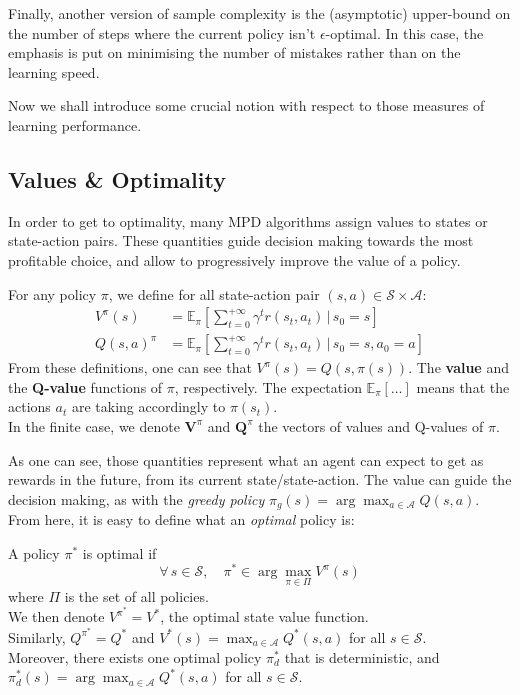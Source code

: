 Finally, another version of sample complexity is the (asymptotic) upper-bound on the number of steps where the current policy isn't $\epsilon$-optimal. In this case, the emphasis is put on minimising the number of mistakes rather than on the learning speed.

Now we shall introduce some crucial notion with respect to those measures of learning performance.

\subsection{Values \& Optimality}
\label{subsec:MDP-values}

In order to get to optimality, many MPD algorithms assign values to states or state-action pairs. These quantities guide decision making towards the most profitable choice, and allow to progressively improve the value of a policy.

\begin{defi}
  For any policy $\pi$, we define for all state-action pair $(s, a) \in \mathcal{S}\times \mathcal{A}$:
  \begin{align*}
  V^\pi(s) &= \mathbb{E}_\pi \left[\sum_{t=0}^{+\infty} \gamma^t r(s_t, a_t) \,|\, s_0=s \right]\\
  Q(s, a)^\pi &= \mathbb{E}_\pi \left[\sum_{t=0}^{+\infty} \gamma^t r(s_t, a_t) \,|\, s_0=s, a_0=a \right]
  \end{align*}
  From these definitions, one can see that $V^\pi(s) = Q(s, \pi(s))$.
  The \textbf{value} and the \textbf{Q-value} functions of $\pi$, respectively. The expectation $\mathbb{E}_\pi[\dots]$ means that the actions $a_t$ are taking accordingly to $\pi(s_t)$.\\
  In the finite case, we denote $\mathbf{V}^\pi$ and $\mathbf{Q}^\pi$ the vectors of values and Q-values of $\pi$.
\end{defi}

As one can see, those quantities represent what an agent can expect to get as rewards in the future, from its current state/state-action. The value can guide the decision making, as with the \emph{greedy policy} $\pi_g(s) = \arg\max_{a \in \mathcal{A}} Q(s, a)$. From here, it is easy to define what an \emph{optimal} policy is:

\begin{defi}[Optimality]
  A policy $\pi^*$ is optimal if $$\forall \, s \in \mathcal{S},\quad \pi^* \in \arg\max_{\pi \in \Pi} V^\pi(s)$$ where $\Pi$ is the set of all policies.\\
  We then denote $V^{\pi^*} = V^*$, the optimal state value function.\\
  Similarly, $Q^{\pi^*} = Q^*$ and $V^*(s) = \max_{a \in \mathcal{A}} Q^*(s, a)$ for all $s \in \mathcal{S}$.\\
  Moreover, there exists one optimal policy $\pi^*_d$ that is deterministic, and $\pi^*_d(s) = \arg\max_{a \in \mathcal{A}} Q^*(s,a)$ for all $s \in \mathcal{S}$.
\end{defi}

